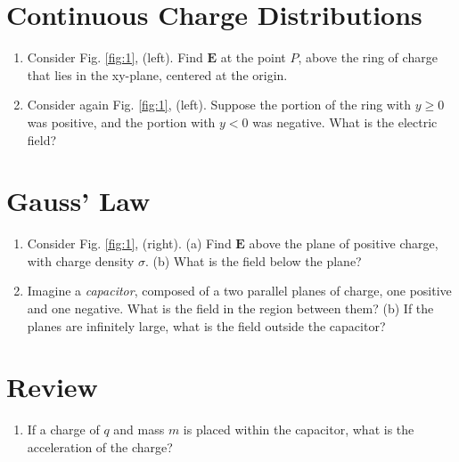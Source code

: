 \documentclass[10pt]{article}
\begin{document}
\section{Continuous Charge Distributions}

\begin{enumerate}
\item Consider Fig. \ref{fig:1}, (left).  Find $\mathbf{E}$ at the point $P$, above the ring of charge that lies in the xy-plane, centered at the origin. \\ \vspace{3cm}
\item Consider again Fig. \ref{fig:1}, (left).  Suppose the portion of the ring with $y\geq 0$ was positive, and the portion with $y<0$ was negative.  What is the electric field? \\ \vspace{3cm}
\end{enumerate}

\section{Gauss' Law}

\begin{enumerate}
\item Consider Fig. \ref{fig:1}, (right).  (a) Find $\mathbf{E}$ above the plane of positive charge, with charge density $\sigma$. (b) What is the field below the plane? \\ \vspace{3cm}
\item Imagine a \textit{capacitor}, composed of a two parallel planes of charge, one positive and one negative.  What is the field in the region between them? (b) If the planes are infinitely large, what is the field outside the capacitor? \\ \vspace{3cm}
\end{enumerate}

\section{Review}

\begin{enumerate}
\item If a charge of $q$ and mass $m$ is placed within the capacitor, what is the acceleration of the charge?
\end{enumerate}
\end{document}

